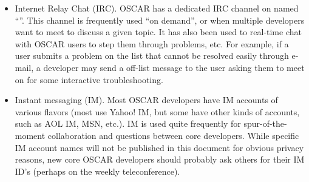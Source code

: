 \begin{itemize}
\item Internet Relay Chat (IRC).  OSCAR has a dedicated IRC channel on
   named
  ``''.  This channel is frequently used
  ``on demand'', or when multiple developers want to meet to discuss a
  given topic.  It has also been used to real-time chat with OSCAR
  users to step them through problems, etc.  For example, if a user
  submits a problem on the  list that cannot be
  resolved easily through e-mail, a developer may send a off-list
  message to the user asking them to meet on
   for some interactive troubleshooting.
  
\item Instant messaging (IM).  Most OSCAR developers have IM accounts
  of various flavors (most use Yahoo! IM, but some have other kinds of
  accounts, such as AOL IM, MSN, etc.).  IM is used quite frequently
  for spur-of-the-moment collaboration and questions between core
  developers.  While specific IM account names will not be published
  in this document for obvious privacy reasons, new core OSCAR
  developers should probably ask others for their IM ID's (perhaps on
  the weekly teleconference).
\end{itemize}
